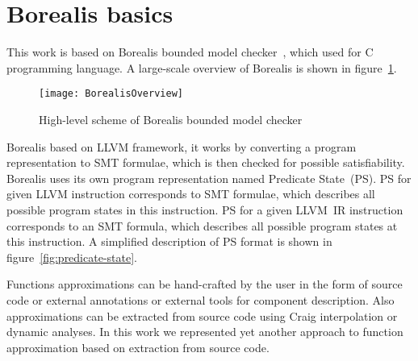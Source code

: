 \section{Borealis basics}\label{sec:basics}

This work is based on Borealis bounded model checker~\cite{Borealis}, which used for C programming language. A large-scale overview of Borealis is shown in figure~\ref{fig:borealis-scheme}.

\begin{figure}[tbh]
\centering
\caption{High-level scheme of Borealis bounded model checker}
\label{fig:borealis-scheme}
\texttt{[image: BorealisOverview]}
\end{figure}

Borealis based on LLVM \cite{LLVM} framework, it works by converting a program representation to SMT formulae, which is then checked for possible satisfiability. Borealis uses its own program representation named Predicate State~(PS). PS for given LLVM instruction corresponds to SMT formulae, which describes all possible program states in this instruction. PS for a given LLVM~IR instruction corresponds to an SMT formula, which describes all possible program states at this instruction. A simplified description of PS format is shown in figure~\ref{fig:predicate-state}.



Functions approximations can be hand-crafted by the user in the form of source code or external annotations or external tools for component description. Also approximations can be extracted from source code using Craig interpolation or dynamic analyses. In this work we represented yet another approach to function approximation based on extraction from source code.